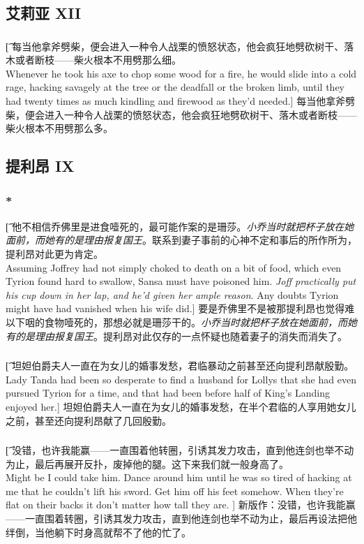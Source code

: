 \documentclass[12pt,a4paper]{article}
\begin{document}
\subsection{艾莉亚 XII}
\subsubsection{}\t[
	每当他拿斧劈柴，便会进入一种令人战栗的愤怒状态，他会疯狂地劈砍树干、落木或者断枝——柴火根本不用劈那么细。\\
	Whenever he took his axe to chop some wood for a fire, he would slide into a cold rage, hacking savagely at the tree or the deadfall or the broken limb, until they had twenty times as much kindling and firewood as they'd needed.]
	每当他拿斧劈柴，便会进入一种令人战栗的愤怒状态，他会疯狂地劈砍树干、落木或者断枝——柴火根本不用劈那么多。
	

\subsection{提利昂 IX}
\subsubsection{\color{red}*}\t[
	他不相信乔佛里是进食噎死的，最可能作案的是珊莎。\emph{小乔当时就把杯子放在她面前，而她有的是理由报复国王}。联系到妻子事前的心神不定和事后的所作所为，提利昂对此更为肯定。\\
	Assuming Joffrey had not simply choked to death on a bit of food, which even Tyrion found hard to swallow, Sansa must have poisoned him. \emph{Joff practically put his cup down in her lap, and he'd given her ample reason}. Any doubts Tyrion might have had vanished when his wife did.]
	要是乔佛里不是被那提利昂也觉得难以下咽的食物噎死的，那想必就是珊莎干的。\emph{小乔当时就把杯子放在她面前，而她有的是理由报复国王}。提利昂对此仅存的一点怀疑也随着妻子的消失而消失了。
	
\subsubsection{}\t[	
	坦妲伯爵夫人一直在为女儿的婚事发愁，君临暴动之前甚至还向提利昂献殷勤。\\
	Lady Tanda had been so desperate to find a husband for Lollys that she had even pursued
	Tyrion for a time, and that had been before half of King's Landing enjoyed her.]
	坦妲伯爵夫人一直在为女儿的婚事发愁，在半个君临的人享用她女儿之前，甚至还向提利昂献了几回殷勤。
	
\subsubsection{}\t[
	没错，也许我能赢——一直围着他转圈，引诱其发力攻击，直到他连剑也举不动为止，最后再展开反扑，废掉他的腿。这下来我们就一般身高了。\\
	Might be I could take him. Dance around him until he was so tired of hacking at me that he couldn't lift his sword. Get him off his feet somehow. When they're flat on their backs it don't matter how tall they are. ]
	新版作：没错，也许我能赢——一直围着转圈，引诱其发力攻击，直到他连剑也举不动为止，最后再设法把他绊倒，当他躺下时身高就帮不了他的忙了。
	
\end{document}
